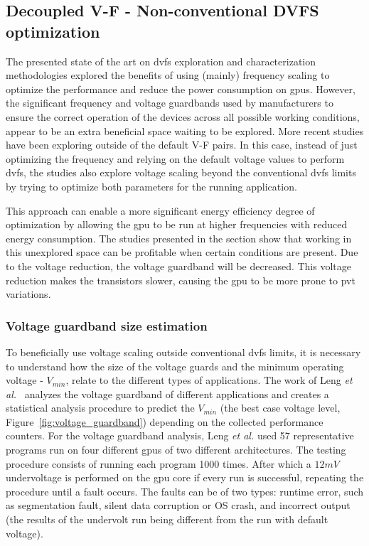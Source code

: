 \subsection{Decoupled V-F - Non-conventional DVFS optimization}
\label{section:decoupled}

The presented state of the art on \acrshort{dvfs} exploration and characterization methodologies explored the benefits of using (mainly) frequency scaling to optimize the performance and reduce the power consumption on \acrshort{gpu}s. However, the significant frequency and voltage guardbands used by manufacturers to ensure the correct operation of the devices across all possible working conditions, appear to be an extra beneficial space waiting to be explored.  More recent studies have been exploring outside of the default V-F pairs. In this case, instead of just optimizing the frequency and relying on the default voltage values to perform \acrshort{dvfs}, the studies also explore voltage scaling beyond the conventional \acrshort{dvfs} limits by trying to optimize both parameters for the running application. 

This approach can enable a more significant energy efficiency degree of optimization by allowing the \acrshort{gpu} to be run at higher frequencies with reduced energy consumption. 
The studies presented in the section show that working in this unexplored space can be profitable when certain conditions are present. Due to the voltage reduction, the voltage guardband will be decreased. This voltage reduction makes the transistors slower, causing the \acrshort{gpu} to be more prone to \acrshort{pvt} variations.

\subsubsection{Voltage guardband size estimation}

To beneficially use voltage scaling outside conventional \acrshort{dvfs} limits, it is necessary to understand how the size of the voltage guards and the minimum operating voltage - $V_{min}$, relate to the different types of applications.
The work of Leng \textit{et al.}~\cite{leng_safe_2015} analyzes the voltage guardband of different applications and creates a statistical analysis procedure to predict the $V_{min}$ (the best case voltage level, Figure~\ref{fig:voltage_guardband}) depending on the collected performance counters. For the voltage guardband analysis, Leng \textit{et al.} used 57 representative programs run on four different \acrshort{gpu}s of two different architectures. The testing procedure consists of running each program 1000 times. After which a $12mV$ undervoltage is performed on the \acrshort{gpu} core if every run is successful, repeating the procedure until a fault occurs. The faults can be of two types: runtime error, such as segmentation fault, silent data corruption or OS crash, and incorrect output (the results of the undervolt run being different from the run with default voltage). 

